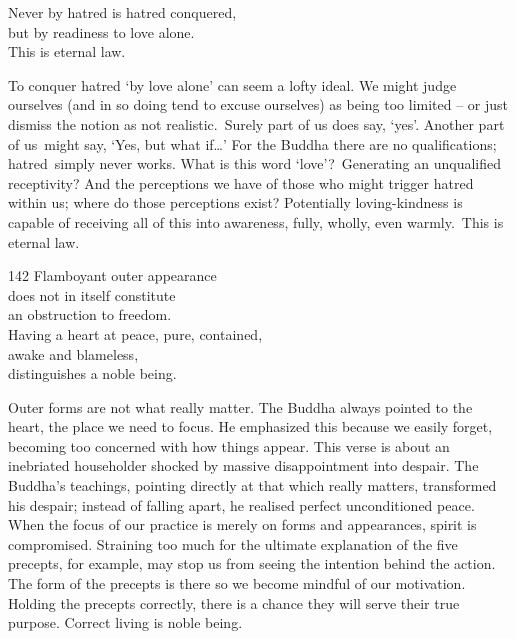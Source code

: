 
\begin{dhpVerse}{5}
\label{dhp-5}
Never by hatred is hatred conquered,\\
but by readiness to love alone.\\
This is eternal law.
\end{dhpVerse}

\begin{dhpRefl}

To conquer hatred `by love alone' can seem a lofty ideal. We might
judge ourselves (and in so doing tend to excuse ourselves) as being
too limited -- or just dismiss the notion as not realistic. Surely
part of us does say, `yes'. Another part of us might say, `Yes, but
what if\ldots{}' For the Buddha there are no qualifications;
hatred simply never works. What is this word `love'? Generating an
unqualified receptivity? And the perceptions we have of those who
might trigger hatred within us; where do those perceptions exist?
Potentially loving-kindness is capable of receiving all of this into
awareness, fully, wholly, even warmly. This is eternal law.

\end{dhpRefl}


\begin{dhpVerse}{142}
\label{dhp-142}
Flamboyant outer appearance\\
does not in itself constitute\\
an obstruction to freedom.\\
Having a heart at peace, pure, contained,\\
awake and blameless,\\
distinguishes a noble being.
\end{dhpVerse}

\begin{dhpRefl}

Outer forms are not what really matter. The Buddha always pointed to
the heart, the place we need to focus. He emphasized this because we
easily forget, becoming too concerned with how things appear. This
verse is about an inebriated householder shocked by massive
disappointment into despair. The Buddha's teachings, pointing
directly at that which really matters, transformed his despair;
instead of falling apart, he realised perfect unconditioned peace.
When the focus of our practice is merely on forms and appearances,
spirit is compromised. Straining too much for the ultimate
explanation of the five precepts, for example, may stop us from
seeing the intention behind the action. The form of the precepts is
there so we become mindful of our motivation. Holding the precepts
correctly, there is a chance they will serve their true purpose.
Correct living is noble being.

\end{dhpRefl}

